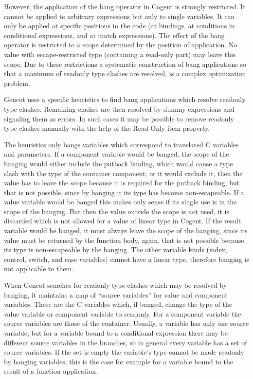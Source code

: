However, the application of the bang operator in Cogent is strongly restricted. It cannot be applied to arbitrary expressions
but only to single variables. It can only be applied at specific positions in the code (at bindings, at conditions in conditional
expressions, and at match expressions). The effect of the bang operator is restricted to a scope determined by the position of
application. No value with escape-restricted type (containing a read-only part) may leave this scope. Due to these restrictions
a systematic construction of bang applications so that a maximum of readonly type clashes are resolved, is a complex optimization
problem.

Gencot uses a specific heuristics to find bang applications which resolve readonly type clashes. Remaining clashes are then
resolved by dummy expressions and signaling them as errors. In such cases it may be possible to remove readonly type clashes
manually with the help of the Read-Only item property.

The heuristics only bangs variables which correspond to translated C variables and parameters. If a component variable would
be banged, the scope of the banging would either include the putback binding, which would cause a type clash with the type of
the container component, or it would exclude it, then the value has to leave the scope because it is required for the putback
binding, but that is not possible, since by banging it its type has become non-escapeable. If a value variable would be banged
this makes only sense if its single use is in the scope of the banging. But then the value outside the scope is not used, it
is discarded which is not allowed for a value of linear type in Cogent. If the result variable would be banged, it must always
leave the scope of the banging, since its value must be returned by the function body, again, that is not possible because its
type is non-escapeable by the banging. The other variable kinds (index, control, switch, and case variables) cannot have a linear
type, therefore banging is not applicable to them.

When Gencot searches for readonly type clashes which may be resolved by banging, it maintains a map of ``source variables'' for
value and component variables. These are the C variables which, if banged, change the type of the value variable or component
variable to readonly. For a component variable the source variables are those of the container. Usually, a variable has only
one source variable, but for a variable bound to a conditional expression there may be different source variables in the branches,
so in general every variable has a set of source variables. If the set is empty the variable's type cannot be made readonly
by banging variables, this is the case for example for a variable bound to the result of a function application.


